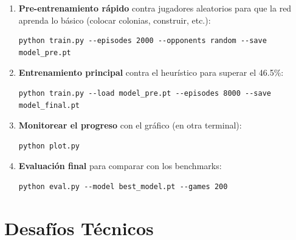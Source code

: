 \documentclass[11pt, a4paper]{article}
\begin{document}
\begin{enumerate}
  \item \textbf{Pre-entrenamiento rápido} contra jugadores aleatorios para que la red
        aprenda lo básico (colocar colonias, construir, etc.):
        \begin{lstlisting}[style=bash]
python train.py --episodes 2000 --opponents random --save model_pre.pt
        \end{lstlisting}

  \item \textbf{Entrenamiento principal} contra el heurístico para superar el 46.5\%:
        \begin{lstlisting}[style=bash]
python train.py --load model_pre.pt --episodes 8000 --save model_final.pt
        \end{lstlisting}

  \item \textbf{Monitorear el progreso} con el gráfico (en otra terminal):
        \begin{lstlisting}[style=bash]
python plot.py
        \end{lstlisting}

  \item \textbf{Evaluación final} para comparar con los benchmarks:
        \begin{lstlisting}[style=bash]
python eval.py --model best_model.pt --games 200
        \end{lstlisting}
\end{enumerate}


\section{Desafíos Técnicos}
\end{document}
